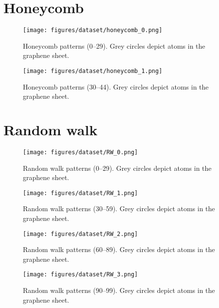 \section{Honeycomb}
\vspace*{-1cm}
\begin{figure}[H]
    \centering
    \texttt{[image: figures/dataset/honeycomb\_0.png]}
    \caption{Honeycomb patterns (0--29). Grey circles depict atoms in the graphene sheet.}
    \label{fig:H0}
\end{figure}
\pagebreak

\begin{figure}[!t]
    \centering
    \vspace*{2.5cm}
    \texttt{[image: figures/dataset/honeycomb\_1.png]}
    \caption{Honeycomb patterns (30--44). Grey circles depict atoms in the graphene sheet.}
    \label{fig:H1}
\end{figure}
\pagebreak

\section{Random walk}
\vspace*{-1cm}
\begin{figure}[H]
    \centering
    \texttt{[image: figures/dataset/RW\_0.png]}
    \caption{Random walk patterns (0--29). Grey circles depict atoms in the graphene sheet.}
    \label{fig:R0}
\end{figure}
\pagebreak

\vspace*{0cm}
\begin{figure}[H]
    \centering
    \texttt{[image: figures/dataset/RW\_1.png]}
    \caption{Random walk patterns (30--59). Grey circles depict atoms in the graphene sheet.}
    \label{fig:R1}
\end{figure}
\pagebreak


\vspace*{0cm}
\begin{figure}[H]
    \centering
    \texttt{[image: figures/dataset/RW\_2.png]}
    \caption{Random walk patterns (60--89). Grey circles depict atoms in the graphene sheet.}
    \label{fig:R2}
\end{figure}
\pagebreak


\vspace*{0cm}
\begin{figure}[H]
    \centering
    \vspace*{1.5cm}
    \texttt{[image: figures/dataset/RW\_3.png]}
    \caption{Random walk patterns (90--99). Grey circles depict atoms in the graphene sheet.}
    \label{fig:R3}
\end{figure}



